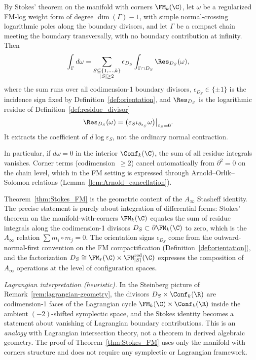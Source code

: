 \begin{theorem}
\label{thm:Stokes_FM}
By Stokes' theorem on the manifold with corners $\FM_k(\C)$, let
$\omega$ be a regularized FM-log weight form of degree
$\dim(\Gamma)-1$, with simple normal-crossing logarithmic poles along
the boundary divisors, and let $\Gamma$ be a compact chain meeting the
boundary transversally, with no boundary contribution at infinity. Then
\[
\int_{\Gamma} d\omega =
\sum_{\substack{S \subseteq \{1,\ldots,k\} \\ |S| \geq 2}}
\epsilon_{D_S}\int_{\Gamma \cap D_S} \Res_{D_S}(\omega),
\]
where the sum runs over all codimension-1 boundary divisors,
\(\epsilon_{D_S}\in\{\pm1\}\) is the incidence sign fixed by
Definition~\ref{def:orientation}, and \(\Res_{D_S}\) is the
logarithmic residue of Definition~\ref{def:residue_divisor}
\[
\Res_{D_S}(\omega)
=\bigl(\varepsilon_S\iota_{\partial_{\varepsilon_S}}\omega\bigr)
\big|_{\varepsilon_S=0}.
\]
It extracts the coefficient of \(d\log\varepsilon_S\), not the
ordinary normal contraction.

In particular, if $d\omega = 0$ in the interior $\Conf_k(\C)$, the sum of all residue integrals vanishes. Corner terms (codimension~$\geq 2$) cancel automatically from $\partial^2 = 0$ on the chain level, which in the FM setting is expressed through Arnold--Orlik--Solomon relations (Lemma~\ref{lem:Arnold_cancellation}).
\end{theorem}

\begin{remark}
\label{rem:stokes-lagrangian}
Theorem~\ref{thm:Stokes_FM} is the geometric content of the
$A_\infty$ Stasheff identity. The precise statement is purely
about integration of differential forms:
Stokes' theorem on the manifold-with-corners $\FM_k(\C)$ equates
the sum of residue integrals along the codimension-1 divisors
$D_S \subset \partial\FM_k(\C)$ to zero, which is the $A_\infty$
relation $\sum m_i \circ m_j = 0$. The orientation signs
$\epsilon_{D_S}$ come from the outward-normal-first convention on
the FM compactification (Definition~\ref{def:orientation}), and the
factorization $D_S \cong \FM_r(\C) \times \FM_{|S|}^{\mathrm{red}}(\C)$ expresses
the composition of $A_\infty$ operations at the level of
configuration spaces.

\smallskip
\noindent\emph{Lagrangian interpretation
\textup{(}heuristic\textup{)}.}
In the Steinberg picture of
Remark~\ref{rem:lagrangian-geometry}, the divisors
$D_S \times \Conf_k(\R)$ are codimension-1 faces of the
Lagrangian cycle $\FM_k(\C) \times \Conf_k(\R)$ inside the
ambient $(-2)$-shifted symplectic space, and the Stokes identity
becomes a statement about vanishing of Lagrangian boundary
contributions. This is an \emph{analogy} with Lagrangian
intersection theory, not a theorem in derived algebraic geometry.
The proof of Theorem~\ref{thm:Stokes_FM} uses only the
manifold-with-corners structure and does not require any
symplectic or Lagrangian framework.
\end{remark}


